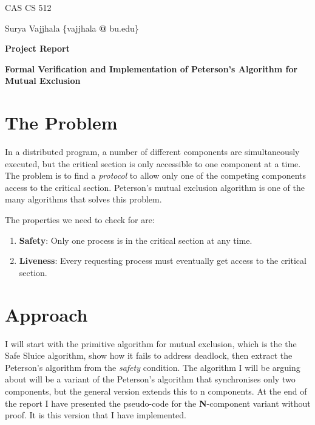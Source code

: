 \documentclass[18pt]{extarticle}
\begin{document}
CAS CS 512

Surya Vajjhala \{vajjhala \large{\textbf{@}} \small{bu.edu}\}

\begin{center}
\Large{\textbf{Project Report}}
\end{center}

\begin{center}
\Large{\textbf{Formal Verification and Implementation of Peterson's Algorithm for Mutual Exclusion}}
\end{center}

\section*{The Problem}
In a distributed program, a number of different components are simultaneously executed, but the critical section is only accessible to one component at a time. \newline \newline
The  problem is to find a \textit{protocol} to allow only one of the competing components access to the critical section. \newline
Peterson's mutual exclusion algorithm is one of the many algorithms that solves this problem. \newline

The properties we need to check for are:
\begin{enumerate}
\item \textbf{Safety}: Only one process is in the critical section at any time.
\item \textbf{Liveness}: Every requesting process must eventually get access to the critical section.
\end{enumerate}


\section*{Approach}

I will start with the primitive algorithm for mutual exclusion, which is the the Safe Sluice algorithm, show how it fails to address deadlock, then extract the Peterson's algorithm from the \textit{safety} condition. \newline \newline
The algorithm I will be arguing about will be a variant of the Peterson's algorithm that synchronises only two components, but the general version extends this to n components. \newline \newline
At the end of the report I have presented the pseudo-code for the \textbf{N}-component variant without proof. It is this version that I have implemented.
\end{document}
